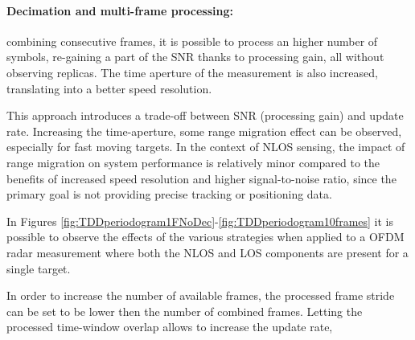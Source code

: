      \paragraph{Decimation and multi-frame processing:}
     combining consecutive frames, it is possible to process an higher number of symbols, re-gaining a part of the SNR thanks to processing gain, all without observing replicas. The time aperture of the measurement is also increased, translating into a better speed resolution.

     This approach introduces a trade-off between SNR (processing gain) and update rate. Increasing the time-aperture, some range migration effect can be observed, especially for fast moving targets. In the context of NLOS sensing, the impact of range migration on system performance is relatively minor compared to the benefits of increased speed resolution and higher signal-to-noise ratio, since the primary goal is not providing precise tracking or positioning data.


    In Figures \ref{fig:TDDperiodogram1FNoDec}-\ref{fig:TDDperiodogram10frames} it is possible to observe the effects of the various strategies when applied to a OFDM radar measurement where both the NLOS and LOS components are present for a single target.
    
    In order to increase the number of available frames, the processed frame stride can be set to be lower then the number of combined frames. Letting the processed time-window overlap allows to increase the update rate, 


